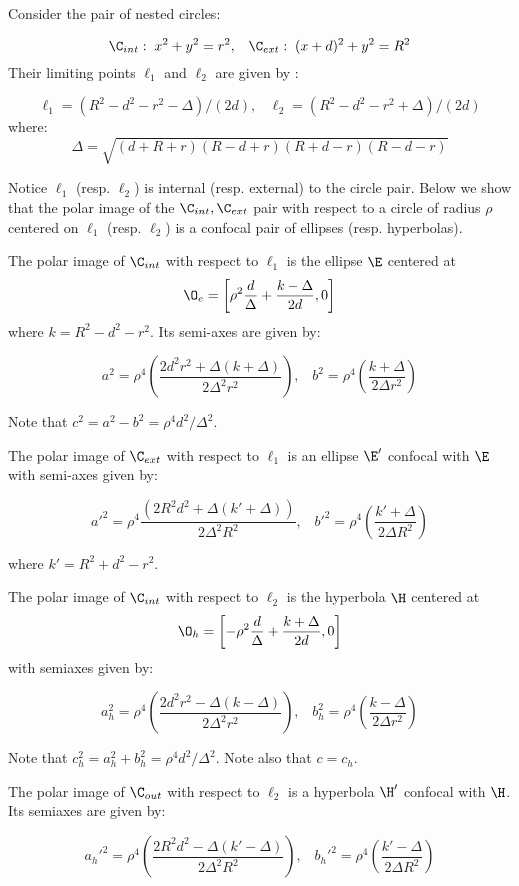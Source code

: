 Consider the pair of nested circles:
 
\[\C_{int}:\;x^2+y^2=r^2,\;\;\;\C_{ext}:\;(x+d)^2+y^2=R^2\]
Their limiting points $\ell_1$ and $\ell_2$ are given by \cite[Limiting Points]{mw}:
 
 \[ \ell_1= (R^2 - d^2 - r^2 -\Delta)/(2d),\;\;\;\ell_2=(R^2 - d^2 - r^2 + \Delta)/(2 d)\]
where:
 \[ \Delta=\sqrt { \left( d+R+r \right)  \left( R-d+r \right)  \left( R+d-r
 \right)  \left( R-d-r \right) }\]

Notice $\ell_1$ (resp. $\ell_2$) is internal (resp. external) to the circle pair. Below we show that the polar image of the  $\C_{int},\C_{ext}$ pair with respect to a circle of radius $\rho$ centered on $\ell_1$ (resp. $\ell_2$) is a confocal pair of ellipses (resp. hyperbolas).

\begin{lemma}
The polar image of $\C_{int}$ with respect to $\ell_1 $ is the ellipse $\E$ centered at
 \[ \O_e=\left[  {\rho}^2\frac{d}{\Delta} +\frac{k-\Delta}{2d},0\right] \]
where $k=R^2 - d^2 - r^2$. Its semi-axes are given by:
 
\[  a^2={\rho}^4\left(\frac{2d^2r^2+ \Delta(k+\Delta)}{ 2 \Delta^2 r^2}\right),\;\;\;b^2= {\rho}^4\left(\frac{k+ \Delta}{2 \Delta r^2}\right) \]
 \end{lemma}
\noindent Note that $c^2=a^2-b^2={\rho}^4d^2/{\Delta^2}$.
 
 \begin{lemma}
 The polar image of $\C_{ext}$ with respect to $\ell_1$ is an ellipse $\E'$ confocal with $\E$ with semi-axes given by:
 
\[  a'^2= {\rho}^4\frac{(2R^2d^2 + \Delta (k'+\Delta ))}{ 2 \Delta^2 R^2},\;\;\;b'^2=  {\rho}^4\left(\frac{k'+\Delta}{ 2 \Delta R^2}\right) \]
 \end{lemma}
 \noindent where $k'=R^2 + d^2 - r^2$.
 
 \begin{lemma}
 The polar image of $\C_{int}$ with respect to $\ell_2 $ is the hyperbola $\H$ centered at
  \[  \O_h=\left[  {-\rho}^2\frac{d}{\Delta} +\frac{k+\Delta}{2d},0\right] \]
 with semiaxes given by:
 
\[  a_h^2={\rho}^4\left(\frac{  2d^2r^2-\Delta(k - \Delta)}{2  \Delta^2 r^2}\right),\;\;\;b_h^2= {\rho}^4\left(\frac{k - \Delta}{2 \Delta r^2}\right)\]
 \end{lemma}
 \noindent Note that $c_h^2=a_h^2+b_h^2={{\rho}^4d^2}/{\Delta^2}$. Note also that $c=c_h$.
 
 \begin{lemma} The polar image of $\C_{out}$ with respect to $\ell_2$ is a hyperbola $\H'$ confocal with $\H$. Its semiaxes are given by:
 
\[ a_h'^2= {\rho}^4\left(\frac{2R^2d^2 - \Delta (k' - \Delta)}{ 2 \Delta^2 R^2}\right),\;\;\; b_h'^2= {\rho}^4 \left(\frac{k' - \Delta}{ 2 \Delta R^2}\right)\]
 \end{lemma}


